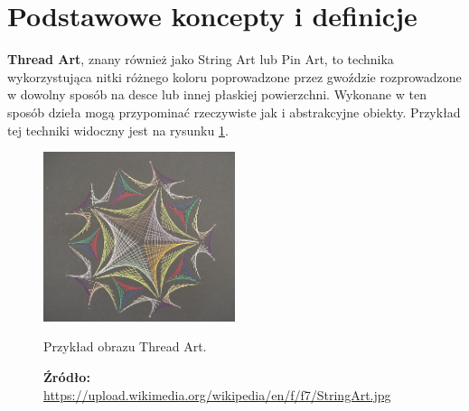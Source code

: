     \section{Podstawowe koncepty i definicje} \label{theory-definitions}
    \textbf{Thread Art}, znany również jako String Art lub Pin Art, to technika wykorzystująca nitki różnego koloru poprowadzone przez gwoździe rozprowadzone w dowolny sposób na desce lub innej płaskiej powierzchni. Wykonane w ten sposób dzieła mogą przypominać rzeczywiste jak i abstrakcyjne obiekty. Przykład tej techniki widoczny jest na rysunku \ref{theory-thread-art}.
    \begin{figure}[htb]
        \centering
        \includegraphics[width=0.5\textwidth,keepaspectratio]{img/2-theory/thread-art.jpg}
        \caption[Przykład obrazu Thread Art]{Przykład obrazu Thread Art.}
        \caption*{\footnotesize{\textbf{Źródło:} {\url{https://upload.wikimedia.org/wikipedia/en/f/f7/StringArt.jpg}}}}
        \label{theory-thread-art}
    \end{figure}
    
